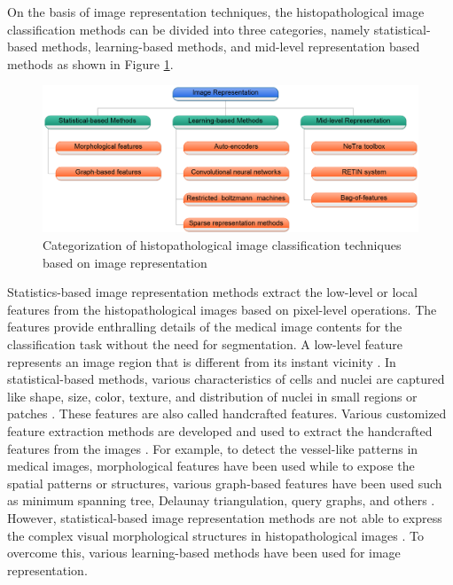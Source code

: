 On the basis of image representation techniques, the histopathological image classification methods can be divided into three categories, namely statistical-based methods, learning-based methods, and mid-level representation based methods as shown in Figure \ref{ch2:fig:IRM}.
\begin{figure}
\centering
     \includegraphics[width=1.0\textwidth]{IRM}
   \caption[Categorization of histopathological image classification techniques based on image representation]{\fontsize{10pt}{12pt}\selectfont Categorization of histopathological image classification techniques based on image representation}
 \label{ch2:fig:IRM}
\end{figure}


Statistics-based image representation methods extract the low-level or local features from the histopathological images based on pixel-level operations. The features provide enthralling details of the medical image contents for the classification task without the need for segmentation. A low-level feature represents an image region that is different from its instant vicinity \cite{tuytelaars2008}. In statistical-based methods, various characteristics of cells and nuclei are captured like shape, size, color, texture, and distribution of nuclei in small regions or patches \cite{dundar2011}. These features are also called handcrafted features. Various customized feature extraction methods are developed and used to extract the handcrafted features from the images \cite{orlov2008}. For example, to detect the vessel-like patterns in medical images, morphological features have been used \cite{zana2001} while to expose the spatial patterns or structures, various graph-based features have been used such as minimum spanning tree, Delaunay triangulation, query graphs, and others \cite{ozdemir2012}. However, statistical-based image representation methods are not able to express the complex visual morphological structures in histopathological images \cite{qureshi2009} \cite{gutierrez2013}. To overcome this, various learning-based methods have been used for image representation.

